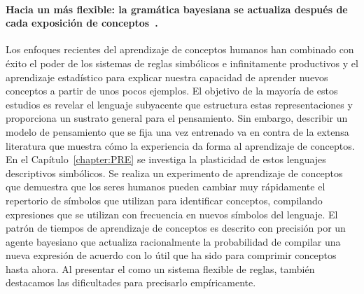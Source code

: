 \paragraph{Hacia un \lot más flexible: la gramática bayesiana se actualiza después de cada exposición de conceptos~\cite{tano2020towards}.}
Los enfoques recientes del aprendizaje de conceptos humanos han combinado con éxito el poder de los sistemas de reglas simbólicos e infinitamente productivos y el aprendizaje estadístico para explicar nuestra capacidad de aprender nuevos conceptos a partir de unos pocos ejemplos. El objetivo de la mayoría de estos estudios es revelar el lenguaje subyacente que estructura estas representaciones y proporciona un sustrato general para el pensamiento. Sin embargo, describir un modelo de pensamiento que se fija una vez entrenado va en contra de la extensa literatura que muestra cómo la experiencia da forma al aprendizaje de conceptos. En el Capítulo~\ref{chapter:PRE} se investiga la plasticidad de estos lenguajes descriptivos simbólicos. Se realiza un experimento de aprendizaje de conceptos que demuestra que los seres humanos pueden cambiar muy rápidamente el repertorio de símbolos que utilizan para identificar conceptos, compilando expresiones que se utilizan con frecuencia en nuevos símbolos del lenguaje. El patrón de tiempos de aprendizaje de conceptos es descrito con precisión por un agente bayesiano que actualiza racionalmente la probabilidad de compilar una nueva expresión de acuerdo con lo útil que ha sido para comprimir conceptos hasta ahora. Al presentar el \lot como un sistema flexible de reglas, también destacamos las dificultades para precisarlo empíricamente.


